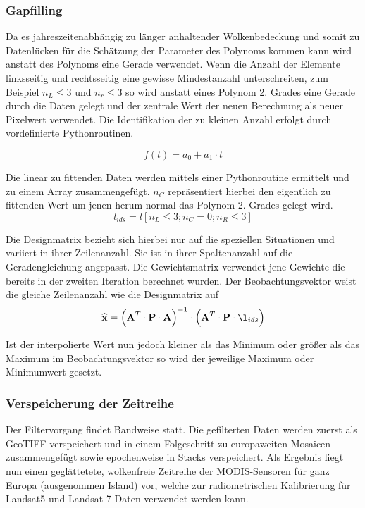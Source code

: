 \documentclass[11pt]{report}
\begin{document}
\subsubsection{Gapfilling}
Da es jahreszeitenabhängig zu länger anhaltender Wolkenbedeckung und somit zu Datenlücken für die Schätzung der Parameter des Polynoms kommen kann wird anstatt des Polynoms eine Gerade verwendet. Wenn die Anzahl der Elemente linksseitig und rechtsseitig eine gewisse Mindestanzahl unterschreiten, zum Beispiel $n_L \leq 3$ und $n_r \leq 3$ so wird anstatt eines Polynom 2. Grades eine Gerade durch die Daten gelegt und der zentrale Wert der neuen Berechnung als neuer Pixelwert verwendet. Die Identifikation der zu kleinen Anzahl erfolgt durch vordefinierte Pythonroutinen.

\begin{equation}
f(t) = a_0 + a_1 \cdot t
\end{equation}\newline

Die linear zu fittenden Daten werden mittels einer Pythonroutine ermittelt und zu einem Array zusammengefügt. $n_C$ repräsentiert hierbei den eigentlich zu fittenden Wert um jenen herum normal das Polynom 2. Grades gelegt wird.
\begin{equation}
l_{ids} = l[n_L\leq 3;n_C=0;n_R\leq3]
\end{equation}\newline

Die Designmatrix bezieht sich hierbei nur auf die speziellen Situationen und variiert in ihrer Zeilenanzahl. Sie ist in ihrer Spaltenanzahl auf die Geradengleichung angepasst. Die Gewichtsmatrix verwendet jene Gewichte die bereits in der zweiten Iteration berechnet wurden. Der Beobachtungsvektor weist die gleiche Zeilenanzahl wie die Designmatrix auf
\begin{equation}
\widehat{\textbf{x}} = \left(\textbf{A}^T\cdot\textbf{P}\cdot\textbf{A}\right)^{-1}\cdot\left(\textbf{A}^T\cdot\textbf{P}\cdot\l_{ids}\right)
\end{equation}\newline

Ist der interpolierte Wert nun jedoch kleiner als das Minimum oder größer als das Maximum im Beobachtungsvektor so wird der jeweilige Maximum oder Minimumwert gesetzt.

\subsubsection{Verspeicherung der Zeitreihe}
Der Filtervorgang findet Bandweise statt. Die gefilterten Daten werden zuerst als GeoTIFF verspeichert und in einem Folgeschritt zu europaweiten Mosaicen zusammengefügt sowie epochenweise in Stacks verspeichert. Als Ergebnis liegt nun einen geglättetete, wolkenfreie Zeitreihe der MODIS-Sensoren für ganz Europa (ausgenommen Island) vor, welche zur radiometrischen Kalibrierung für Landsat5 und Landsat 7 Daten verwendet werden kann.
\end{document}
